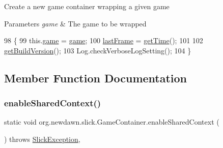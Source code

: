 Create a new game container wrapping a given game


\begin{DoxyParams}{Parameters}
{\em game} & The game to be wrapped \\
\hline
\end{DoxyParams}

\begin{DoxyCode}
98                                        \{
99         this.\mbox{\hyperlink{classorg_1_1newdawn_1_1slick_1_1_game_container_a6a38bb26e45e1c884940caf35c7cfcdc}{game}} = \mbox{\hyperlink{classorg_1_1newdawn_1_1slick_1_1_game_container_a6a38bb26e45e1c884940caf35c7cfcdc}{game}};
100         \mbox{\hyperlink{classorg_1_1newdawn_1_1slick_1_1_game_container_ab61d2b2082e7bdf429ded14d1caa5484}{lastFrame}} = \mbox{\hyperlink{classorg_1_1newdawn_1_1slick_1_1_game_container_a1650b161216693ec0b4c0d9d00496c05}{getTime}}();
101 
102         \mbox{\hyperlink{classorg_1_1newdawn_1_1slick_1_1_game_container_a3f678756d7085368d56a710127d7dd67}{getBuildVersion}}();
103         Log.checkVerboseLogSetting();
104     \}
\end{DoxyCode}


\subsection{Member Function Documentation}
\mbox{\label{classorg_1_1newdawn_1_1slick_1_1_game_container_a5cc7494b95d6266057fc755a8a4f7e60}} 
\subsubsection{\texorpdfstring{enable\+Shared\+Context()}{enableSharedContext()}}
{\footnotesize\ttfamily static void org.\+newdawn.\+slick.\+Game\+Container.\+enable\+Shared\+Context (\begin{DoxyParamCaption}{ }\end{DoxyParamCaption}) throws \mbox{\hyperlink{classorg_1_1newdawn_1_1slick_1_1_slick_exception}{Slick\+Exception}}\hspace{0.3cm}{\ttfamily [inline]}, {\ttfamily [static]}}

